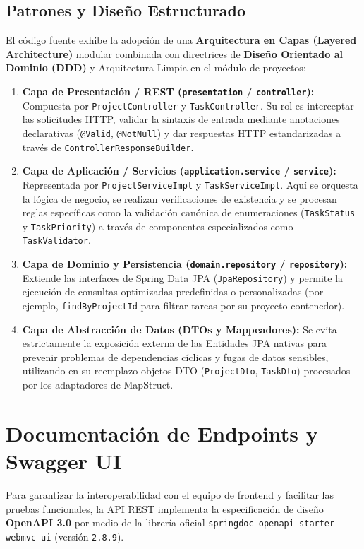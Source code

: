 \documentclass[12pt,a4paper]{article}
\begin{document}
\subsection{Patrones y Diseño Estructurado}
El código fuente exhibe la adopción de una \textbf{Arquitectura en Capas (Layered Architecture)} modular combinada con directrices de \textbf{Diseño Orientado al Dominio (DDD)} y Arquitectura Limpia en el módulo de proyectos:
\begin{enumerate}
    \item \textbf{Capa de Presentación / REST (\texttt{presentation} / \texttt{controller}):} Compuesta por \texttt{ProjectController} y \texttt{TaskController}. Su rol es interceptar las solicitudes HTTP, validar la sintaxis de entrada mediante anotaciones declarativas (\texttt{@Valid}, \texttt{@NotNull}) y dar respuestas HTTP estandarizadas a través de \texttt{ControllerResponseBuilder}.
    \item \textbf{Capa de Aplicación / Servicios (\texttt{application.service} / \texttt{service}):} Representada por \texttt{ProjectServiceImpl} y \texttt{TaskServiceImpl}. Aquí se orquesta la lógica de negocio, se realizan verificaciones de existencia y se procesan reglas específicas como la validación canónica de enumeraciones (\texttt{TaskStatus} y \texttt{TaskPriority}) a través de componentes especializados como \texttt{TaskValidator}.
    \item \textbf{Capa de Dominio y Persistencia (\texttt{domain.repository} / \texttt{repository}):} Extiende las interfaces de Spring Data JPA (\texttt{JpaRepository}) y permite la ejecución de consultas optimizadas predefinidas o personalizadas (por ejemplo, \texttt{findByProjectId} para filtrar tareas por su proyecto contenedor).
    \item \textbf{Capa de Abstracción de Datos (DTOs y Mappeadores):} Se evita estrictamente la exposición externa de las Entidades JPA nativas para prevenir problemas de dependencias cíclicas y fugas de datos sensibles, utilizando en su reemplazo objetos DTO (\texttt{ProjectDto}, \texttt{TaskDto}) procesados por los adaptadores de MapStruct.
\end{enumerate}

\section{Documentación de Endpoints y Swagger UI}
Para garantizar la interoperabilidad con el equipo de frontend y facilitar las pruebas funcionales, la API REST implementa la especificación de diseño \textbf{OpenAPI 3.0} por medio de la librería oficial \texttt{springdoc-openapi-starter-webmvc-ui} (versión \texttt{2.8.9}).
\end{document}
